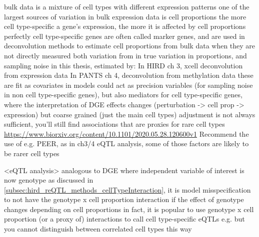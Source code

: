 \begin{outline}
\1 bulk data is a mixture of cell types with different expression patterns
    \2 one of the largest sources of variation in bulk expression data is cell proportions 
    \2 the more cell type-specific a gene's expression, the more it is affected by cell proportions \autocite{farahbod2020UntanglingEffectsCellular}
        \3 perfectly cell type-specific genes are often called marker genes, and are used in deconvolution methods to estimate cell proportions from bulk data when they are not directly measured
    \2 both variation from in true variation in proportions, and sampling noise
    \2 in this thesis, estimated by:
        \3 In HIRD ch 3, xcell deconvolution from expression data
        \3 In PANTS ch 4, deconvolution from methylation data
    \2 these are fit as covariates in models
        \3 could act as precision variables (for sampling noise in non cell type-specific genes),
        \3 but also mediators for cell type-specific genes, where the interpretation of DGE effects changes (perturbation -> cell prop -> expression)
    \2 but coarse grained (just the main cell types) adjustment is not always sufficient, you'll still find associations that are proxies for rare cell types \url{https://www.biorxiv.org/content/10.1101/2020.05.28.120600v1}
        \3 Recommend the use of e.g. PEER, as in ch3/4 eQTL analysis, some of those factors are likely to be rarer cell types

\1 <eQTL analysis>
    \2 analogous to DGE where independent variable of interest is now genotype
    \2 as discussed in \autoref{subsec:hird_reQTL_methods_cellTypeInteraction}, it is model misspecification to not have the genotype x cell proportion interaction if the effect of genotype changes depending on cell proportions
        \3 in fact, it is popular to use genotype x cell proportion (or a proxy of) interactions to call cell type-specific eQTLs e.g. \autocite{westra2015CellSpecificEQTL,kim-hellmuth2020CellTypeSpecific}
        \3 but you cannot distinguish between correlated cell types this way


\end{outline}
